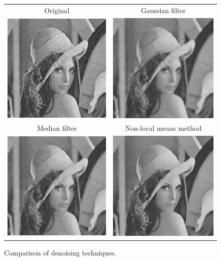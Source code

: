 \begin{figure}[t]
\centering
{\sffamily
\begin{tabular}{cc}
Original & Gaussian filter \\
\includegraphics[width=.4\linewidth]{img/preprocessing/denoise_orig.png}
&
\includegraphics[width=.4\linewidth]{img/preprocessing/denoise_gauss.png}
\vspace{1em} \\
Median filter & Non-local means method \\
\includegraphics[width=.4\linewidth]{img/preprocessing/denoise_median.png}
&
\includegraphics[width=.4\linewidth]{img/preprocessing/denoise_nonlocal.png}
\end{tabular}
}
\caption{Comparison of denoising techniques.}
\label{fig:preprocessDenoising}
\end{figure}

